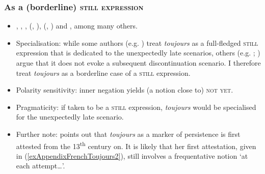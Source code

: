 \subsubsection{As a (borderline) \textsc{still expression}}
\label{appendixFrenchToujours}
\begin{itemize}
	\item \textcite[s.v. \textit{toujours}]{Dicctionnaire}, \textcite{vanderAuwera1998}, \textcite{Fuchs1988}, \citeauthor{MosegaardHansen2002} (\citeyear{MosegaardHansen2002}, \citeyear[148–150]{MosegaardHansen2008}), \citeauthor{Muller1975} (\citeyear{Muller1975}, \citeyear{Muller1991}) and \textcite{Vaelikangas1982}, among many others.
	 \item Specialisation: while some authors (e.g. \cite{vanderAuwera1998}) treat \textit{toujours} as a full-fledged \textsc{still} expression that is dedicated to the unexpectedly late scenarios, others (e.g. \cite[148–150]{MosegaardHansen2008}; \cite{Fuchs1988}) argue that it does not evoke a subsequent discontinuation scenario. I therefore treat \textit{toujours} as a borderline case of a \textsc{still} expression.
	 \item Polarity sensitivity: inner negation yields (a notion close to) \textsc{not yet}.
	 \item Pragmaticity: if taken to be a \textsc{still} expression, \textit{toujours} would be specialised for the unexpectedly late scenario.
	 \item Further note: \textcite[149]{MosegaardHansen2008} points out that \textit{toujours} as a marker of persistence is first attested from the 13\textsuperscript{th} century on. It is likely that her first attestation, given in (\ref{exAppendixFrenchToujours2}), still involves a frequentative notion \lq at each attempt…\rq{}.
\end{itemize}
